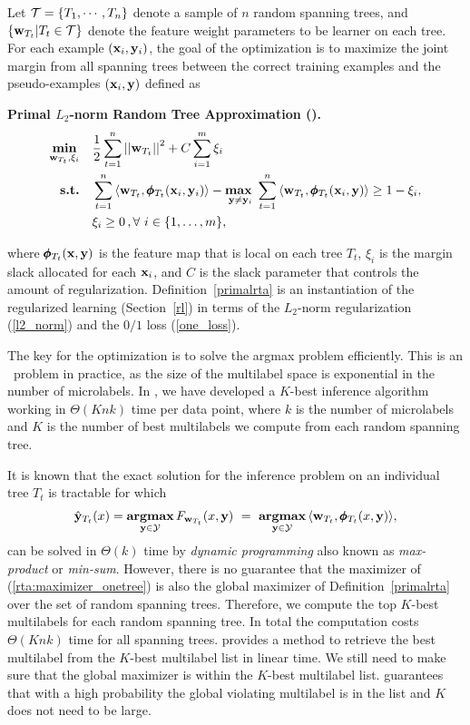 {Let $\mathcal{T}=\{T_1,\cdots,T_n\}$ denote a sample of $n$ random spanning trees, and $\{\mathbf {w}_{T_t}|T_t\in\mathcal{T}\}$ denote the feature weight parameters to be learner on each tree.
For each example $(\mathbf {x}_i,\mathbf {y}_i)$, the goal of the optimization is to maximize the joint margin from all spanning trees between the correct training examples and the pseudo-examples $(\mathbf {x}_i,\mathbf {y})$ defined as
\begin{definition}{\bf Primal $L_2$-norm Random Tree Approximation (\rta).}\label{primalrta}
	\begin{align*}
		\underset{\vw_{T_t},\xi_i}{\minimize} & \quad \frac{1}{2}\sum_{t=1}^{n}\norm{\vw_{T_t}}^2 + C\sum_{i=1}^{m}\xi_i\\
		\st & \quad \sum_{t=1}^{n}{ \langle \vw_{T_t}, \phib_{T_t}(\vx_i,\vy_i) \rangle} - \underset{\vy \neq \vy_i}{\maximize\ } \sum_{t=1}^{n}{\langle \vw_{T_t}, \phib_{T_t}(\vx_i,\vy) \rangle } \geq 1 -  \xi_i, \\
		& \quad \xi_i\ge0\, , \forall\ i \in \set{1,\dots,m},
	\end{align*}
\end{definition}
\noindent
where $\pmb \phi_{T_t}(\mathbf {x},\mathbf {y})$ is the feature map that is local on each tree $T_t$, $\xi_i$ is the margin slack allocated for each $\mathbf {x}_i$, and $C$ is the slack parameter that controls the amount of regularization.
Definition~\ref{primalrta} is an instantiation of the regularized learning (Section~\ref{rl}) in terms of the $L_2$-norm regularization (\ref{l2_norm}) and the $0/1$ loss (\ref{one_loss}).

The key for the optimization is to solve the argmax problem efficiently.
This is an \nphard\ problem in practice, as the size of the multilabel space is exponential in the number of microlabels.
In , we have developed a $K$-best inference algorithm working in $\Theta(Knk)$ time per data point, where $k$ is the number of microlabels and $K$ is the number of best multilabels we compute from each random spanning tree.

It is known that the exact solution for the inference problem on an individual tree $T_t$ is tractable \citep{Koller09probabilistic} for which 
\begin{align}
	\hat{\mathbf {y}}_{T_t}(x) = \underset{\mathbf {y}\in\mathcal{Y}}{\textbf{argmax}}\, F_{\mathbf {w}_{T_t}}(x,\mathbf {y})\ =\ \underset{\mathbf {y}\in\mathcal{Y}}{\textbf{argmax}}\, \langle \mathbf {w}_{T_t}, \pmb \phi_{T_t}(x,\mathbf {y})\rangle, \label{rta:maximizer_onetree}
\end{align}
can be solved in $\Theta(k)$ time by \textit{dynamic programming} also known as \textit{max-product} or \textit{min-sum}.
However, there is no guarantee that the maximizer of (\ref{rta:maximizer_onetree}) is also the global maximizer of Definition~\ref{primalrta} over the set of random spanning trees.
Therefore, we compute the top $K$-best multilabels for each random spanning tree.
In total the computation costs $\Theta(Knk)$ time for all spanning trees.
 provides a method to retrieve the best multilabel from the $K$-best multilabel list in linear time.
We still need to make sure that the global maximizer is within the $K$-best multilabel list.
 guarantees that with a high probability the global violating multilabel is in the list and $K$ does not need to be large.

}
